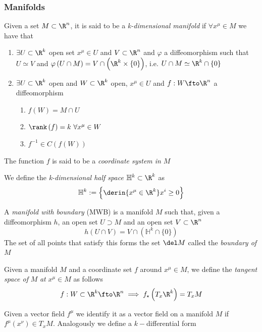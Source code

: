 \documentclass[../mmf.tex]{subfiles}
\begin{document}
\subsubsection{Manifolds}
\begin{dfn}[Manifold]
	Given a set $M\subset\R^n$, it is said to be a \textit{k-dimensional manifold} if $\forall x^\mu\in M$ we have that
	\begin{enumerate}
	\item $\exists U\subset\R^k$ open set $x^\mu\in U$ and $V\subset\R^n$ and $\varphi$ a diffeomorphism such that $U\simeq V$ and $\varphi\left( U\cap M \right)=V\cap\left( \R^k\times\{0\} \right)$, i.e. $U\cap M\simeq\R^k\cap\{0\}$
	\item $\exists U\subset\R^k$ open and $W\subset\R^k$ open, $x^\mu\in U$ and $f:W\fto\R^n$ a diffeomorphism
		\begin{enumerate}
		\item $f(W)=M\cap U$
		\item $\rank\left( f \right)=k\ \forall x^\mu\in W$
		\item $f^{-1}\in C(f(W))$
		\end{enumerate}
	\end{enumerate}
	The function $f$ is said to be a \textit{coordinate system in} $M$
\end{dfn}
\begin{dfn}
	We define the \textit{k-dimensional half space} $\mathbb{H}^k\subset\R^k$ as
	\begin{equation}
		\mathbb{H}^k:=\left\{ \derin{x^\mu\in\R^k}x^i\ge0 \right\}
		\label{eq:halfspacerk}
	\end{equation}
\end{dfn}
\begin{dfn}
	A \textit{manifold with boundary} (MWB) is a manifold $M$ such that, given a diffeomorphism $h$, an open set $U\supset M$ and an open set $V\subset\R^n$
	\begin{equation}
		h\left( U\cap V \right)=V\cap\left( \mathbb{H}^k\cap\{0\} \right)
		\label{eq:manifoldwb}
	\end{equation}
	The set of all points that satisfy this forms the set $\del M$ called the \textit{boundary of} $M$
\end{dfn}
\begin{dfn}
	Given a manifold $M$ and a coordinate set $f$ around $x^\mu\in M$, we define the \textit{tangent space of} $M$ \textit{at} $x^\mu\in M$ as follows
	\begin{equation}
		f:W\subset\R^k\fto\R^n\implies{} f_{\star}\left( T_x\R^k \right)=T_xM
		\label{eq:tangentspaceman}
	\end{equation}
\end{dfn}
\begin{dfn}
	Given a vector field $f^\mu$ we identify it as a vector field on a manifold $M$ if $f^\mu(x^\nu)\in T_xM$. Analogously we define a $k-$differential form
\end{dfn}
\end{document}
